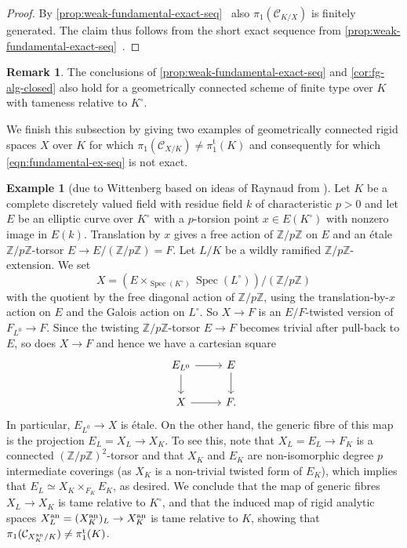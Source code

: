\documentclass[a4paper,twoside,11pt,reqno]{amsart}
\renewcommand{\mathbb}{\mathds}
\newcommand{\bZ}{{\mathbb Z}}
\newcommand{\cC}{{\mathcal C}}
\DeclareMathOperator{\Spec}{Spec}
\newcommand{\pitame}{\pi_1^{\mathrm{t}}}
\theoremstyle{definition}
\newtheorem{rmk}[thm]{Remark}
\newtheorem{ex}[thm]{Example}
\numberwithin{equation}{subsection}
\begin{document}
\begin{proof}
By \cref{prop:weak-fundamental-exact-seq}~ also 
$\pi_1(\cC_{K/X})$ is finitely generated. The claim thus follows from the short exact sequence from
\cref{prop:weak-fundamental-exact-seq}~.
\end{proof}

\begin{rmk}
    The conclusions of \cref{prop:weak-fundamental-exact-seq} and \cref{cor:fg-alg-closed} also hold for a geometrically connected scheme of finite type over $K$ with tameness relative to $K^\circ$.
\end{rmk}

We finish this subsection by giving two examples of geometrically connected rigid spaces $X$ over $K$ for which $\pi_1(\cC_{X/K})\neq \pitame(K)$ and consequently for which \eqref{eqn:fundamental-ex-seq} is not exact. 

\begin{ex}[{due to Wittenberg based on ideas of Raynaud from  \cite[\S9]{Raynaud1970:SpecialisationFoncteurPicard}}] \label{ex:Raynaud inspired example}
    Let $K$ be a complete discretely valued field with residue field $k$ of characteristic $p>0$ and let $E$ be an elliptic curve over $K^\circ$ with a $p$-torsion point $x\in E(K^\circ)$ with nonzero image in $E(k)$. Translation by $x$ gives a free action of $\bZ/p\bZ$ on $E$ and an \'etale $\bZ/p\bZ$-torsor $E\to E/(\bZ/p\bZ)=F$.   
    Let $L/K$ be a wildly ramified $\mathbb{Z}/p\mathbb{Z}$-extension. We set
    \[
        X = \left(E\times_{\Spec(K^\circ)} \Spec(L^\circ)\right)\bigg/ (\bZ/p\bZ)
    \]
    with the quotient by the free diagonal action of $\bZ/p\bZ$, using the translation-by-$x$ action on $E$ and the Galois action on $L^\circ$. 
    So $X \to F$ is an $E/F$-twisted version of $F_{L^0} \to F$. Since the twisting $\bZ/p\bZ$-torsor $E\to F$ becomes trivial after pull-back to $E$, so does $X \to F$ and hence we have a cartesian square
    \[
        \begin{tikzcd}
            E_{L^0} \ar[r] \ar[d] & E \ar[d] \\
            X \ar[r] & F.
        \end{tikzcd}
    \]
    In particular, $E_{L^0}\to X$ is \'etale. On the other hand, the generic fibre of this map is the projection $E_L = X_L\to X_K$. To see this, note that $X_L=E_L\to F_K$ is a connected $(\bZ/p\bZ)^2$-torsor and that $X_K$ and $E_K$ are non-isomorphic degree $p$ intermediate coverings (as $X_K$ is a non-trivial twisted form of $E_K$), which implies that $E_L \simeq X_K\times_{F_K} E_K$, as desired.
    We conclude that the map of generic fibres $X_L\to X_K$ is tame relative to $K^\circ$, and that the induced map of rigid analytic spaces $X_L^{\rm an}=(X_K^{\rm an})_L\to X_K^{\rm an}$ is tame relative to $K$, showing that $\pi_1(\cC_{X_K^{\rm an}/K})\neq\pitame(K)$.
\end{ex}
\end{document}
